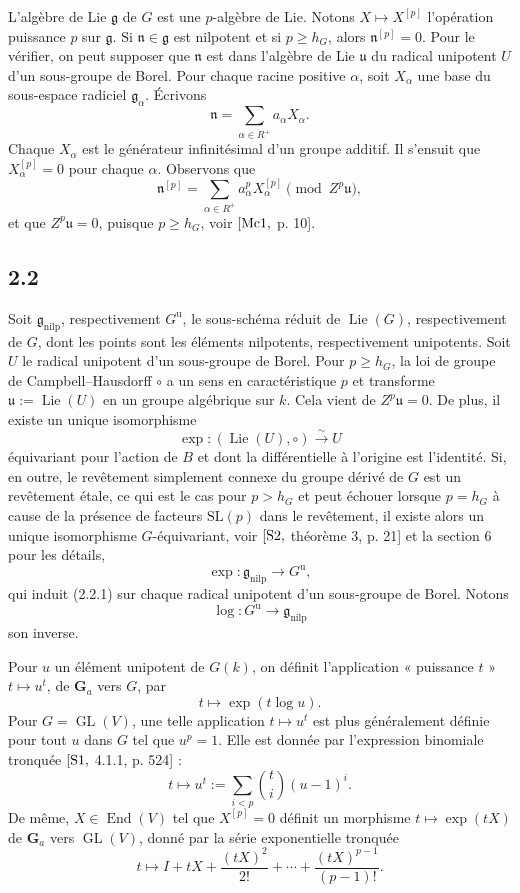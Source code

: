 \documentclass[11pt]{article}
\newcommand{\Ga}{\mathbf G_a}
\newcommand{\Lie}{\operatorname{Lie}}
\newcommand{\GL}{\operatorname{GL}}
\newcommand{\nilp}{\mathrm{nilp}}
\newcommand{\unip}{\mathrm u}
\begin{document}
L'algèbre de Lie \(\mathfrak g\) de \(G\) est une \(p\)-algèbre de Lie. Notons
\(X\mapsto X^{[p]}\) l'opération puissance \(p\) sur \(\mathfrak g\). Si
\(\mathfrak n\in\mathfrak g\) est nilpotent et si \(p\ge h_G\), alors
\(\mathfrak n^{[p]}=0\). Pour le vérifier, on peut supposer que \(\mathfrak n\) est
dans l'algèbre de Lie \(\mathfrak u\) du radical unipotent \(U\) d'un sous-groupe de
Borel. Pour chaque racine positive \(\alpha\), soit \(X_\alpha\) une base du sous-espace
radiciel \(\mathfrak g_\alpha\). Écrivons
\[
  \mathfrak n=\sum_{\alpha\in R^+} a_\alpha X_\alpha .
\]
Chaque \(X_\alpha\) est le générateur infinitésimal d'un groupe additif. Il s'ensuit que
\(X_\alpha^{[p]}=0\) pour chaque \(\alpha\). Observons que
\[
  \mathfrak n^{[p]}
  =\sum_{\alpha\in R^+} a_\alpha^{p}X_\alpha^{[p]}
    \pmod{Z^p\mathfrak u}, \tag{2.1.3}
\]
et que \(Z^p\mathfrak u=0\), puisque \(p\ge h_G\), voir \([{\rm Mc1},\) p. 10].

\subsection*{2.2}

Soit \(\mathfrak g_{\nilp}\), respectivement \(G^{\unip}\), le sous-schéma réduit de
\(\Lie(G)\), respectivement de \(G\), dont les points sont les éléments nilpotents,
respectivement unipotents. Soit \(U\) le radical unipotent d'un sous-groupe de Borel.
Pour \(p\ge h_G\), la loi de groupe de Campbell--Hausdorff \(\circ\) a un sens en
caractéristique \(p\) et transforme \(\mathfrak u:=\Lie(U)\) en un groupe algébrique
sur \(k\). Cela vient de \(Z^p\mathfrak u=0\). De plus, il existe un unique isomorphisme
\[
  \exp:(\Lie(U),\circ)\xrightarrow{\sim} U \tag{2.2.1}
\]
équivariant pour l'action de \(B\) et dont la différentielle à l'origine est l'identité.
Si, en outre, le revêtement simplement connexe du groupe dérivé de \(G\) est un
revêtement étale, ce qui est le cas pour \(p>h_G\) et peut échouer lorsque \(p=h_G\)
à cause de la présence de facteurs \(\mathrm{SL}(p)\) dans le revêtement, il existe alors
un unique isomorphisme \(G\)-équivariant, voir \([{\rm S2},\) théorème 3, p. 21] et
la section 6 pour les détails,
\[
  \exp:\mathfrak g_{\nilp}\longrightarrow G^{\unip}, \tag{2.2.2}
\]
qui induit (2.2.1) sur chaque radical unipotent d'un sous-groupe de Borel. Notons
\[
  \log:G^{\unip}\longrightarrow \mathfrak g_{\nilp}
\]
son inverse.

Pour \(u\) un élément unipotent de \(G(k)\), on définit l'application « puissance \(t\) »
\(t\mapsto u^t\), de \(\Ga\) vers \(G\), par
\[
  t\longmapsto \exp(t\log u). \tag{2.2.3}
\]
Pour \(G=\GL(V)\), une telle application \(t\mapsto u^t\) est plus généralement définie
pour tout \(u\) dans \(G\) tel que \(u^p=1\). Elle est donnée par l'expression binomiale
tronquée \([{\rm S1},\) 4.1.1, p. 524] :
\[
  t\longmapsto u^t:=\sum_{i<p}\binom{t}{i}(u-1)^i. \tag{2.2.4}
\]
De même, \(X\in\operatorname{End}(V)\) tel que \(X^{[p]}=0\) définit un morphisme
\(t\mapsto \exp(tX)\) de \(\Ga\) vers \(\GL(V)\), donné par la série exponentielle
tronquée
\[
  t\longmapsto I+tX+\frac{(tX)^2}{2!}+\cdots+
  \frac{(tX)^{p-1}}{(p-1)!}. \tag{2.2.5}
\]
\end{document}
